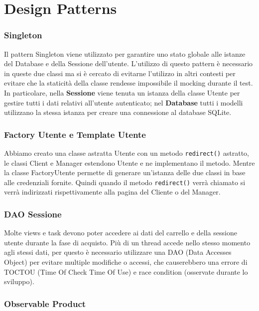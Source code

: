 \documentclass[12pt, a4paper]{report}
\begin{document}
\newpage

\section{Design Patterns}

\subsubsection{Singleton}	

Il pattern Singleton viene utilizzato per garantire uno stato globale alle
istanze del Database e della Sessione dell'utente. L'utilizzo di questo pattern
è necessario in queste due classi ma si è cercato di evitarne l'utilizzo in
altri contesti per evitare che la staticità della classe rendesse impossibile
il mocking durante il test. In particolare, nella \textbf{Sessione} viene
tenuta un istanza della classe Utente per gestire tutti i dati relativi
all'utente autenticato; nel \textbf{Database} tutti i modelli utilizzano la
stessa istanza per creare una connessione al database SQLite. 

\subsubsection{Factory Utente e Template Utente}

Abbiamo creato una classe astratta Utente con un metodo \verb|redirect()|
astratto, le classi Client e Manager estendono Utente e ne implementano il
metodo. Mentre la classe FactoryUtente permette di generare un'istanza delle
due classi in base alle credenziali fornite. Quindi quando il metodo
\verb|redirect()| verrà chiamato si verrà indirizzati rispettivamente alla
pagina del Cliente o del Manager.

\subsubsection{DAO Sessione}

Molte views e task devono poter accedere ai dati del carrello e della sessione
utente durante la fase di acquisto. Più di un thread accede nello stesso
momento agli stessi dati, per questo è necessario utilizzare una DAO (Data
Accesses Object) per evitare multiple modifiche o accessi, che causerebbero una
errore di TOCTOU (Time Of Check Time Of Use) e race condition (osservate
durante lo sviluppo).

\subsubsection{Observable Product}
\end{document}

